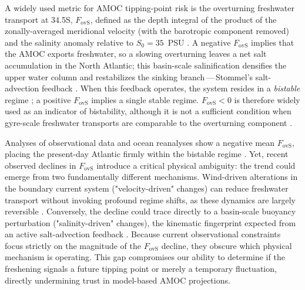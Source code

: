 \documentclass[11pt,a4paper]{article}
\begin{document}
A widely used metric for AMOC tipping-point risk is the overturning freshwater transport at 34.5\textdegree S, $F_{\mathrm{ovS}}$, defined as the depth integral of the product of the zonally-averaged meridional velocity (with the barotropic component removed) and the salinity anomaly relative to $S_0 = 35$~PSU \citep{deVriesWeber2005, HofmannRahmstorf2009}. A negative $F_{\mathrm{ovS}}$ implies that the AMOC exports freshwater, so a slowing overturning leaves a net salt accumulation in the North Atlantic; this basin-scale salinification densifies the upper water column and restabilizes the sinking branch\,---\,Stommel's salt-advection feedback \citep{Stommel1961}. When this feedback operates, the system resides in a \emph{bistable} regime \citep{Rahmstorf1996, Dijkstra2007, vanWesten2024, Cimatoribus2014}; a positive $F_{\mathrm{ovS}}$ implies a single stable regime. $F_{\mathrm{ovS}}<0$ is therefore widely used as an indicator of bistability, although it is not a sufficient condition when gyre-scale freshwater transports are comparable to the overturning component \citep{Gent2018}.

Analyses of observational data and ocean reanalyses show a negative mean \(F_{\mathrm{ovS}}\), placing the present-day Atlantic firmly within the bistable regime \citep{ArumiPlanas2024, Portmann2026}. Yet, recent observed declines in \(F_{\mathrm{ovS}}\) introduce a critical physical ambiguity: the trend could emerge from two fundamentally different mechanisms. Wind-driven alterations in the boundary current system ("velocity-driven" changes) can reduce freshwater transport without invoking profound regime shifts, as these dynamics are largely reversible \citep{Chemke2021}. Conversely, the decline could trace directly to a basin-scale buoyancy perturbation ("salinity-driven" changes), the kinematic fingerprint expected from an active salt-advection feedback \citep{deVriesWeber2005, Drijfhout2011, vanWesten2024, Liu2017, Sgubin2017, FallahInReview}. Because current observational constraints focus strictly on the magnitude of the \(F_{\mathrm{ovS}}\) decline, they obscure which physical mechanism is operating. This gap compromises our ability to determine if the freshening signals a future tipping point or merely a temporary fluctuation, directly undermining trust in model-based AMOC projections.
\end{document}
